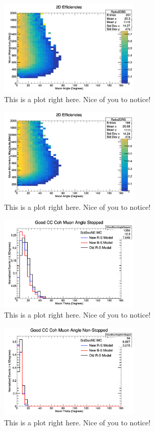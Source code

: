 \documentclass[11pt]{article}
\begin{document}
\begin{figure}[H]
\centering
\includegraphics[width=0.6\textwidth]{NMCombinedPlotsImages/8-NMCombinedPlots.png}
\caption{This is a plot right here. Nice of you to notice!}
\end{figure}

\begin{figure}[H]
\centering
\includegraphics[width=0.6\textwidth]{NMCombinedPlotsImages/9-NMCombinedPlots.png}
\caption{This is a plot right here. Nice of you to notice!}
\end{figure}

\begin{figure}[H]
\centering
\includegraphics[width=0.6\textwidth]{NMCombinedPlotsImages/10-NMCombinedPlots.png}
\caption{This is a plot right here. Nice of you to notice!}
\end{figure}

\begin{figure}[H]
\centering
\includegraphics[width=0.6\textwidth]{NMCombinedPlotsImages/11-NMCombinedPlots.png}
\caption{This is a plot right here. Nice of you to notice!}
\end{figure}
\end{document}
